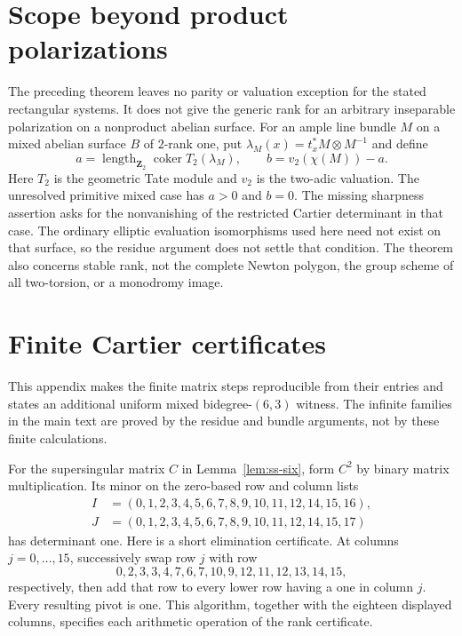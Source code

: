 \documentclass[11pt]{article}
\theoremstyle{definition}\newtheorem{definition}[theorem]{Definition}
\theoremstyle{remark}\newtheorem{remark}[theorem]{Remark}
\begin{document}
\section{Scope beyond product polarizations}

The preceding theorem leaves no parity or valuation exception for the stated rectangular systems. It does not give the generic rank for an arbitrary inseparable polarization on a nonproduct abelian surface. For an ample line bundle $M$ on a mixed abelian surface $B$ of $2$-rank one, put $\lambda_M(x)=t_x^*M\otimes M^{-1}$ and define
\[
 a=\operatorname{length}_{\mathbf Z_2}\operatorname{coker}T_2(\lambda_M),
 \qquad b=v_2(\chi(M))-a.
\]
Here $T_2$ is the geometric Tate module and $v_2$ is the two-adic valuation. The unresolved primitive mixed case has $a>0$ and $b=0$. The missing sharpness assertion asks for the nonvanishing of the restricted Cartier determinant in that case. The ordinary elliptic evaluation isomorphisms used here need not exist on that surface, so the residue argument does not settle that condition. The theorem also concerns stable rank, not the complete Newton polygon, the group scheme of all two-torsion, or a monodromy image.

\appendix
\section{Finite Cartier certificates}\label{app:cert}

This appendix makes the finite matrix steps reproducible from their entries and states an additional uniform mixed bidegree-$(6,3)$ witness. The infinite families in the main text are proved by the residue and bundle arguments, not by these finite calculations.

For the supersingular matrix $C$ in Lemma~\ref{lem:ss-six}, form $C^2$ by binary matrix multiplication. Its minor on the zero-based row and column lists
\begin{align*}
 I&=(0,1,2,3,4,5,6,7,8,9,10,11,12,14,15,16),\\
 J&=(0,1,2,3,4,5,6,7,8,9,10,11,12,14,15,17)
\end{align*}
has determinant one. Here is a short elimination certificate. At columns $j=0,\ldots,15$, successively swap row $j$ with row
\[
                0,2,3,3,4,7,6,7,10,9,12,11,12,13,14,15,
\]
respectively, then add that row to every lower row having a one in column $j$. Every resulting pivot is one. This algorithm, together with the eighteen displayed columns, specifies each arithmetic operation of the rank certificate.
\end{document}
